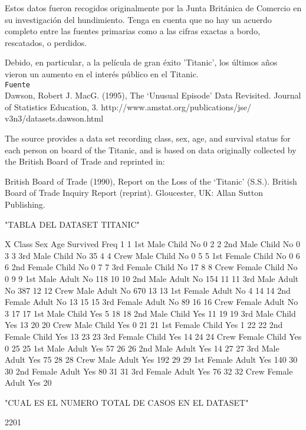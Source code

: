 \documentclass[12pt,a4paper]{article}
\begin{document}
Estos datos fueron recogidos originalmente por la Junta Británica de Comercio en su investigación del hundimiento. Tenga en cuenta que no hay un acuerdo completo entre las fuentes primarias como a las cifras exactas a bordo, rescatados, o perdidos.

Debido, en particular, a la película de gran éxito 'Titanic', los últimos años vieron un aumento en el interés público en el Titanic. \\

\texttt{Fuente}\\

Dawson, Robert J. MacG. (1995), The ‘Unusual Episode’ Data Revisited. Journal of Statistics Education, 3. http://www.amstat.org/publications/jse/\\
v3n3/datasets.dawson.html

The source provides a data set recording class, sex, age, and survival status for each person on board of the Titanic, and is based on data originally collected by the British Board of Trade and reprinted in:

British Board of Trade (1990), Report on the Loss of the ‘Titanic’ (S.S.). British Board of Trade Inquiry Report (reprint). Gloucester, UK: Allan Sutton Publishing. 
\begin{Schunk}
\begin{Soutput}
[1] "TABLA DEL DATASET TITANIC"
\end{Soutput}
\begin{Soutput}
    X Class    Sex   Age Survived Freq
1   1   1st   Male Child       No    0
2   2   2nd   Male Child       No    0
3   3   3rd   Male Child       No   35
4   4  Crew   Male Child       No    0
5   5   1st Female Child       No    0
6   6   2nd Female Child       No    0
7   7   3rd Female Child       No   17
8   8  Crew Female Child       No    0
9   9   1st   Male Adult       No  118
10 10   2nd   Male Adult       No  154
11 11   3rd   Male Adult       No  387
12 12  Crew   Male Adult       No  670
13 13   1st Female Adult       No    4
14 14   2nd Female Adult       No   13
15 15   3rd Female Adult       No   89
16 16  Crew Female Adult       No    3
17 17   1st   Male Child      Yes    5
18 18   2nd   Male Child      Yes   11
19 19   3rd   Male Child      Yes   13
20 20  Crew   Male Child      Yes    0
21 21   1st Female Child      Yes    1
22 22   2nd Female Child      Yes   13
23 23   3rd Female Child      Yes   14
24 24  Crew Female Child      Yes    0
25 25   1st   Male Adult      Yes   57
26 26   2nd   Male Adult      Yes   14
27 27   3rd   Male Adult      Yes   75
28 28  Crew   Male Adult      Yes  192
29 29   1st Female Adult      Yes  140
30 30   2nd Female Adult      Yes   80
31 31   3rd Female Adult      Yes   76
32 32  Crew Female Adult      Yes   20
\end{Soutput}
\begin{Soutput}
[1] "CUAL ES EL NUMERO TOTAL DE CASOS EN EL DATASET"
\end{Soutput}
\begin{Soutput}
[1] 2201
\end{Soutput}
\end{Schunk}
\end{document}
